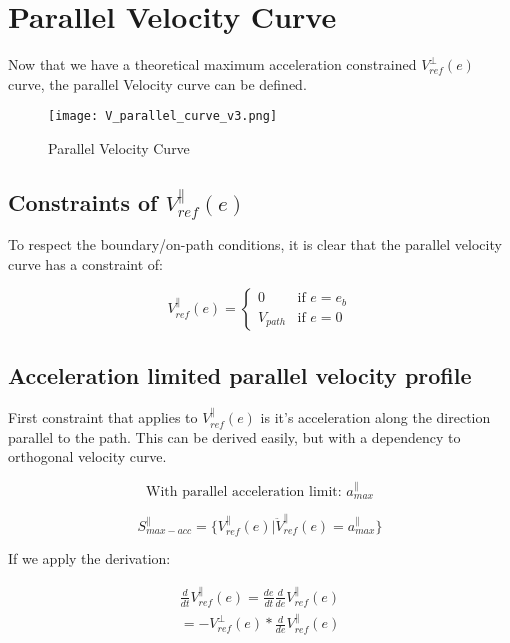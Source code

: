 \section{Parallel Velocity Curve}
Now that we have a theoretical maximum acceleration constrained $V_{ref}^{\perp}(e)$ curve, the parallel Velocity curve can be defined.

\begin{figure}[h]
\centering
\texttt{[image: V\_parallel\_curve\_v3.png]}
\caption{\label{fig:v_parallel_curve}Parallel Velocity Curve}
\end{figure}

\subsection{Constraints of $V_{ref}^{\parallel}(e)$}
To respect the boundary/on-path conditions, it is clear that the parallel velocity curve has a constraint of:

\begin{equation}
V_{ref}^{\parallel}(e)=\begin{cases}
    0& \text{if $e = e_b$}\\
    V_{path}& \text{if $e = 0$}
\end{cases}
\label{eq:v_parallel_constraints}
\end{equation}

\subsection{Acceleration limited parallel velocity profile}
First constraint that applies to $V_{ref}^{\parallel}(e)$ is it's acceleration along the direction parallel to the path. This can be derived easily, but with a dependency to orthogonal velocity curve.

\begin{equation}
    \text{With parallel acceleration limit: } a^{\parallel}_{max}
\end{equation}

\begin{equation}
    S^{\parallel}_{max-acc} = \{V_{ref}^{\parallel}(e) | \ddot{V}_{ref}^{\parallel}(e) = a^{\parallel}_{max}\}
\end{equation}

If we apply the derivation:

\begin{equation}
    \begin{split}
    \frac{d}{dt}V_{ref}^{\parallel}(e) = \frac{de}{dt}\frac{d}{de}V_{ref}^{\parallel}(e)\\
    = -V_{ref}^{\perp}(e) * \frac{d}{de}V_{ref}^{\parallel}(e)
    \end{split}
\end{equation}

